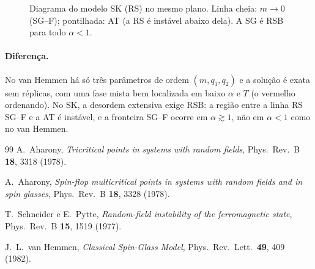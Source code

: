 \documentclass[12pt,a4paper]{article}
\begin{document}
\begin{figure}[H]
\centering
{}
\caption{Diagrama do modelo SK (RS) no mesmo plano. Linha cheia: $m\to0$ (SG--F);
pontilhada: AT (a RS é instável abaixo dela). A SG é RSB para todo $\alpha<1$.}
\label{fig:sk_phase}
\end{figure}

\paragraph{Diferença.} No van Hemmen há só três parâmetros de ordem
$(m,q_1,q_2)$ e a solução é exata sem réplicas, com uma fase mista bem
localizada em baixo $\alpha$ e $T$ (o vermelho ordenando). No SK, a desordem
extensiva exige RSB: a região entre a linha RS SG--F e a AT é instável, e
a fronteira SG--F ocorre em $\alpha\gtrsim1$, não em $\alpha<1$ como no van Hemmen.
%
\begin{thebibliography}{99}
  A.~Aharony,
  \textit{Tricritical points in systems with random fields},
  Phys.\ Rev.\ B \textbf{18}, 3318 (1978).

  A.~Aharony,
  \textit{Spin-flop multicritical points in systems with random fields
  and in spin glasses},
  Phys.\ Rev.\ B \textbf{18}, 3328 (1978).

  T.~Schneider e E.~Pytte,
  \textit{Random-field instability of the ferromagnetic state},
  Phys.\ Rev.\ B \textbf{15}, 1519 (1977).

  J.~L.\ van Hemmen,
  \textit{Classical Spin-Glass Model},
  Phys.\ Rev.\ Lett.\ \textbf{49}, 409 (1982).
  
\end{thebibliography}
\end{document}
